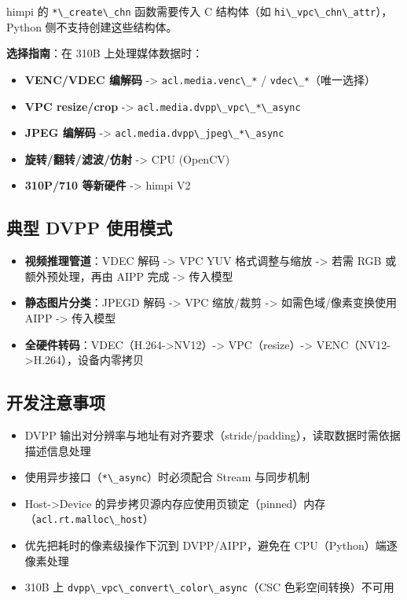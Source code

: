 himpi 的 \passthrough{\lstinline!*\_create\_chn!} 函数需要传入 C
结构体（如 \passthrough{\lstinline!hi\_vpc\_chn\_attr!}），Python
侧不支持创建这些结构体。

\textbf{选择指南}：在 310B 上处理媒体数据时：

\begin{itemize}
\tightlist
\item
  \textbf{VENC/VDEC 编解码} -\textgreater{}
  \passthrough{\lstinline!acl.media.venc\_*!} /
  \passthrough{\lstinline!vdec\_*!}（唯一选择）
\item
  \textbf{VPC resize/crop} -\textgreater{}
  \passthrough{\lstinline!acl.media.dvpp\_vpc\_*\_async!}
\item
  \textbf{JPEG 编解码} -\textgreater{}
  \passthrough{\lstinline!acl.media.dvpp\_jpeg\_*\_async!}
\item
  \textbf{旋转/翻转/滤波/仿射} -\textgreater{} CPU (OpenCV)
\item
  \textbf{310P/710 等新硬件} -\textgreater{} himpi V2
\end{itemize}

\subsection{典型 DVPP 使用模式}\label{src-book-chapter6-h7}

\begin{itemize}
\tightlist
\item
  \textbf{视频推理管道}：VDEC 解码 -\textgreater{} VPC YUV
  格式调整与缩放 -\textgreater{} 若需 RGB 或额外预处理，再由 AIPP 完成
  -\textgreater{} 传入模型
\item
  \textbf{静态图片分类}：JPEGD 解码 -\textgreater{} VPC 缩放/裁剪
  -\textgreater{} 如需色域/像素变换使用 AIPP -\textgreater{} 传入模型
\item
  \textbf{全硬件转码}：VDEC（H.264-\textgreater NV12）-\textgreater{}
  VPC（resize）-\textgreater{}
  VENC（NV12-\textgreater H.264），设备内零拷贝
\end{itemize}

\subsection{开发注意事项}\label{src-book-chapter6-h8}

\begin{itemize}
\tightlist
\item
  DVPP
  输出对分辨率与地址有对齐要求（stride/padding），读取数据时需依据描述信息处理
\item
  使用异步接口（\passthrough{\lstinline!*\_async!}）时必须配合 Stream
  与同步机制
\item
  Host-\textgreater Device
  的异步拷贝源内存应使用页锁定（pinned）内存（\passthrough{\lstinline!acl.rt.malloc\_host!}）
\item
  优先把耗时的像素级操作下沉到 DVPP/AIPP，避免在
  CPU（Python）端逐像素处理
\item
  310B 上
  \passthrough{\lstinline!dvpp\_vpc\_convert\_color\_async!}（CSC
  色彩空间转换）不可用
\end{itemize}

